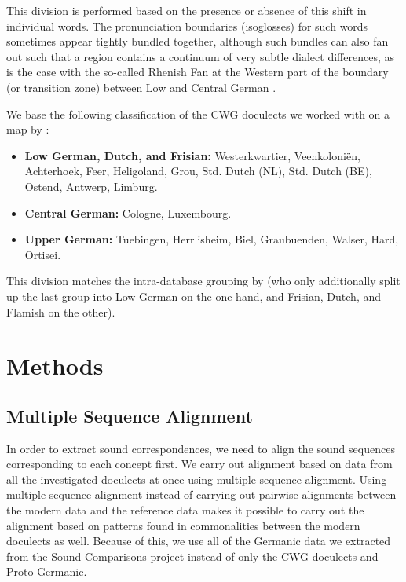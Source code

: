 \documentclass[a4paper]{article}
\begin{document}
This division is performed based on
the presence or absence of this shift in individual words.
The pronunciation boundaries (isoglosses) for such words
sometimes appear tightly bundled together,
although such bundles can also fan out such that a region
contains a continuum of very subtle dialect differences,
as is the case with the so-called Rhenish Fan at the Western part
of the boundary (or transition zone) between Low and Central German
\citep[pp. 63, 138, 141]{koenig2015dtv}.

We base the following classification of
the CWG doculects we worked with
on a map by \citet[pp. 230-231]{koenig2015dtv}:

\begin{itemize}
\item
\textbf{Low German, Dutch, and Frisian:}
Westerkwartier, Veenkoloni\"{e}n, Achterhoek,
Feer, Heligoland, Grou,
Std. Dutch (NL), Std. Dutch (BE), Ostend, Antwerp, Limburg.

\item
\textbf{Central German:}
Cologne, Luxembourg.

\item
\textbf{Upper German:}
Tuebingen, Herrlisheim,
Biel, Graubuenden, Walser, Hard, Ortisei.
\end{itemize}

This division matches the intra-database grouping by \citet{heggarty2018sound}
(who only additionally split up the last group into
Low German on the one hand,
and Frisian, Dutch, and Flamish on the other).

\section{Methods}
\label{sec:methods}

\subsection{Multiple Sequence Alignment}
\label{subsec:msa}

In order to extract sound correspondences, we need to align the sound sequences corresponding to each concept first.
We carry out alignment based on data from all the investigated doculects at once using multiple sequence alignment.
Using multiple sequence alignment instead of carrying out pairwise alignments between the modern data and the reference data makes it possible to carry out the alignment based on patterns found in commonalities between the modern doculects as well.
Because of this, we use all of the Germanic data we extracted from the Sound Comparisons project instead of only the CWG doculects and Proto-Germanic.
\end{document}
